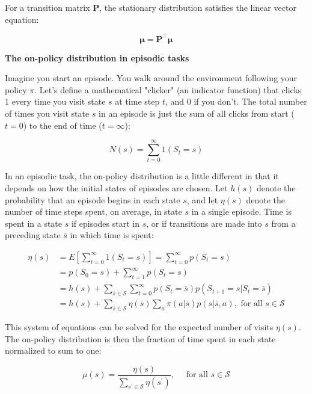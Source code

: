 \documentclass{article}
\begin{document}
For a transition matrix $\mathbf{P}$, the stationary distribution satisfies the linear vector equation:

$$
\pmb { \mu } = \mathbf { P } ^ { \top } \pmb { \mu }
$$

\textbf{The on-policy distribution in episodic tasks}

Imagine you start an episode. You walk around the environment following your policy \(\pi \). Let's define a mathematical "clicker" (an indicator function) that clicks 1 every time you visit state \(s\) at time step \(t\), and 0 if you don't. 
The total number of times you visit state \(s\) in an episode is just the sum of all clicks from start (\(t=0\)) to the end of time (\(t=\infty\)):

$$
N(s) = \sum_{t=0}^{\infty} 1(S_t = s)
$$

In an episodic task, the on-policy distribution is a little different in that it depends on how the initial states of episodes are chosen. Let $h ( s )$ denote the probability that an episode begins in each state $s$, 
and let $\eta ( s )$ denote the number of time steps spent, on average, in state $s$ in a single episode. Time is spent in a state $s$ if episodes start in $s$, or if transitions are made into $s$ from a preceding state $\overline { s }$ in which time is spent:

\begin{equation*}
\begin{split}
\eta (s)
& = E \left[ \sum _{t=0}^{\infty }1(S_{t}=s) \right] = \sum_{t=0}^{\infty} p(S_t = s) \\
& = p(S_0 = s) + \sum_{t=1}^{\infty} p(S_t = s) \\
& = h ( s ) + \sum _ { \overline { s } \in \mathcal { S } } \sum_{t=0}^{\infty} p(S_t = \overline { s }) p(S_{t + 1} = s | S_t = \overline { s }) \\
& = h ( s ) + \sum _ { \overline { s } \in \mathcal { S } } \eta ( \overline { s } ) \sum _ { a } \pi ( a | \overline { s } ) p ( s | \overline { s } , a ) , \text { for all } s \in \mathcal { S }
\end{split}
\end{equation*}

This system of equations can be solved for the expected number of visits $\eta ( s )$. The on-policy distribution is then the fraction of time spent in each state normalized to sum to one:

$$
\mu ( s ) = { \frac { \eta ( s ) } { \sum _ { s ^ { \prime } \in \mathcal { S } } \eta ( s ^ { \prime } ) } } , \quad { \text { for all } } s \in { \mathcal { S } }
$$
\end{document}
